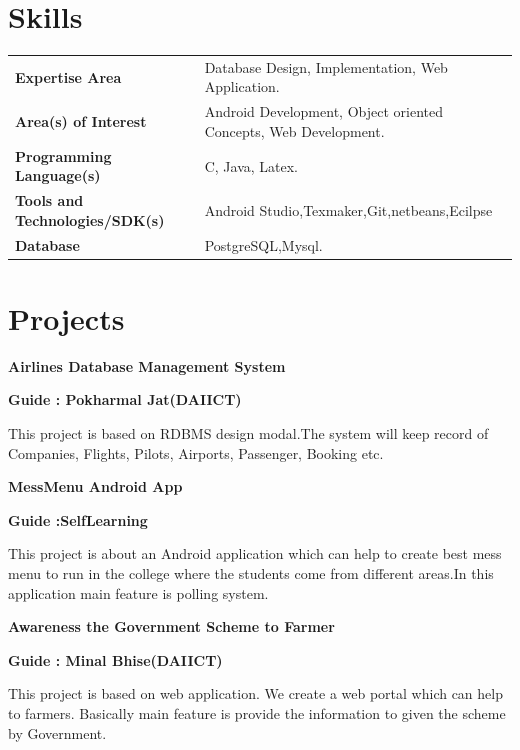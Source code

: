\documentclass{article}
\begin{document}
\section{Skills}
\begin{tabular}{ll}
\textbf{Expertise Area} & Database Design, Implementation, Web Application. \\
\textbf{Area(s) of Interest}& Android Development, Object oriented Concepts, Web Development.\\
\textbf{Programming Language(s)}& C, Java, Latex.\\
\textbf{Tools and Technologies/SDK(s)} & Android Studio,Texmaker,Git,netbeans,Ecilpse\\
\textbf{Database} & PostgreSQL,Mysql.\\

\end{tabular}


\section{Projects}
\begin{large}\textbf{Airlines Database Management System }\end{large} \begin{flushright}\textbf{Guide : Pokharmal Jat(DAIICT)}\\\end{flushright}
This project is based on RDBMS design modal.The system
will keep record of Companies, Flights, Pilots, Airports, Passenger, Booking etc.

\begin{large}\textbf{MessMenu Android App}\end{large} \begin{flushright}\textbf{Guide :SelfLearning}\end{flushright}This project is about an Android application which can help to create best mess menu to run in the college where the students come from different areas.In this application main feature is polling system.

\begin{large}\textbf{Awareness the Government Scheme to Farmer}\end{large} \begin{flushright}\textbf{Guide : Minal Bhise(DAIICT)}\\\end{flushright}
This project is based on web application. We create a web portal which can help to farmers. Basically main feature is provide the information to given the scheme by Government.   
\end{document}
